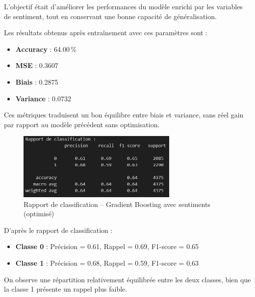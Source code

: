 \documentclass[a4paper,12pt]{article}
\begin{document}
L’objectif était d’améliorer les performances du modèle enrichi par les variables de sentiment, tout en conservant une bonne capacité de généralisation. 

Les résultats obtenus après entraînement avec ces paramètres sont :
\begin{itemize}
    \item \textbf{Accuracy} : 64.00\,\%
    \item \textbf{MSE} : 0.3607
    \item \textbf{Biais} : 0.2875
    \item \textbf{Variance} : 0.0732
\end{itemize}

Ces métriques traduisent un bon équilibre entre biais et variance, sans réel gain par rapport au modèle précédent sans optimisation.

\begin{figure}[H]
    \centering
    \includegraphics[width=0.7\textwidth]{classification_sentiment_gridsearch.png}
    \caption{Rapport de classification -- Gradient Boosting avec sentiments (optimisé)}
    \label{fig:classification_sentiment_gridsearch}
\end{figure}

D’après le rapport de classification :
\begin{itemize}
    \item \textbf{Classe 0} : Précision = 0.61, Rappel = 0.69, F1-score = 0.65
    \item \textbf{Classe 1} : Précision = 0.68, Rappel = 0.59, F1-score = 0.63
\end{itemize}

On observe une répartition relativement équilibrée entre les deux classes, bien que la classe 1 présente un rappel plus faible.
\end{document}
